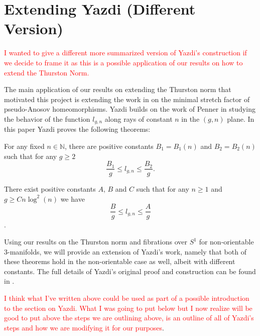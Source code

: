 \section{Extending Yazdi (Different Version)}

\textcolor{red}{I wanted to give a different more summarized version of Yazdi's construction if we decide to frame it as this is a possible application of our results on how to extend the Thurston Norm.}

The main application of our results on extending the Thurston norm that motivated this project is extending the work in \cite{yazdi2018pseudo} on the minimal stretch factor of pseudo-Anosov homeomorphisms. Yazdi builds on the work of Penner in studying the behavior of the function $l_{g,n}$ along rays of constant $n$ in the $(g,n)$ plane. In this paper Yazdi proves the following theorems:

\begin{thm}
For any fixed $n \in \mathbb{N}$, there are positive constants $B_1 = B_1(n)$ and $B_2 = B_2(n)$ such that for any $g \geq 2$
$$\frac{B_1}{g} \leq l_{g,n} \leq \frac{B_2}{g}.$$
\end{thm}

\begin{thm}
There exist positive constants $A$, $B$ and $C$ such that for any $n \geq 1$ and $g \geq Cn\log^2(n)$ we have $$\frac{B}{g} \leq l_{g,n} \leq \frac{A}{g}$$.
\end{thm}

Using our results on the Thurston norm and fibrations over $S^1$ for non-orientable 3-manifolds, we will provide an extension of Yazdi's work, namely that both of these theorems hold in the non-orientable case as well, albeit with different constants. The full details of Yazdi's original proof and construction can be found in \cite{yazdi2018pseudo}.

\textcolor{red}{I think what I've written above could be used as part of a possible introduction to the section on Yazdi. What I was going to put below but I now realize will be good to put above the steps we are outlining above, is an outline of all of Yazdi's steps and how we are modifying it for our purposes}.





